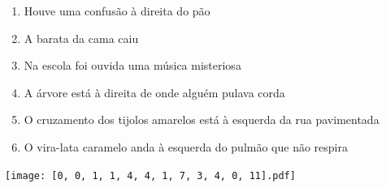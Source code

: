 \documentclass[12pt]{article}
\begin{document}
		 

\pagebreak


	\begin{enumerate}
		  \sffamily %
		  \large %


\vfill \item
Houve uma confusão	%
à direita
do pão	%

\vfill \item
A barata	%
da cama caiu	%

\vfill \item
Na escola	%
foi ouvida uma música misteriosa	%

\vfill \item
A árvore está	%
à direita
de onde alguém pulava corda	%

\vfill \item
O cruzamento dos tijolos amarelos está	%
à esquerda
da rua pavimentada	%

\vfill \item
O vira-lata caramelo anda	%
à esquerda
do pulmão que não respira	%
	\end{enumerate}
		  
		  \hfill

		  \vfill

\texttt{[image: [0, 0, 1, 1, 4, 4, 1, 7, 3, 4, 0, 11].pdf]}


	\hfill	  	  


\pagebreak			
\end{document}
